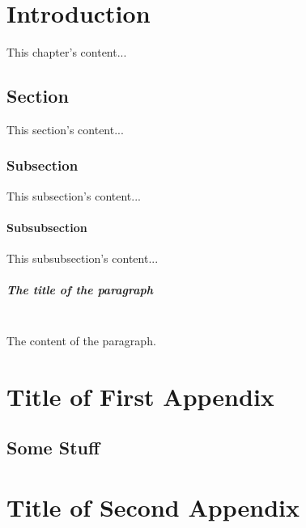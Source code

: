 \documentclass[12pt,letterpaper,oneside]{report}
\begin{document}



\newpage
{}
\doublespacing %

\chapter{Introduction}
This chapter's content...

\section{Section}
This section's content...

\subsection{Subsection}
This subsection's content...

\subsubsection{Subsubsection}
This subsubsection's content...

\paragraph{The title of the paragraph}~\\
The content of the paragraph.


\appendix
\chapter{Title of First Appendix}
\section{Some Stuff}
\chapter{Title of Second Appendix}

\end{document}

